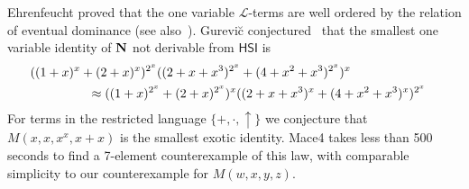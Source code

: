 \documentclass[eqnor,reqno]{amsart}
\theoremstyle{plain}
\theoremstyle{definition}
\newcommand{\HSI}{\textsf{HSI}}
\begin{document}
Ehrenfeucht \cite{ehr} proved that the one variable $\mathscr{L}$-terms
are well ordered by the relation of eventual dominance (see also~\cite[Theorem~A.5]{alsjac2}).  Gurevi\u{c}
conjectured~\cite[Remark~2 on page~29]{gur90} that the smallest one variable identity of ${\bf
N}$ not derivable from
$\HSI$ is 
%
\begin{eqnarray*}
\lefteqn{((1+x)^x+(2+x)^x)^{2^x}((2+x+x^3)^{2^x}+
(4+x^2+x^3)^{2^x})^x}&&\\
&\phantom{abcdefdgh}\approx 
((1+x)^{2^x}+(2+x)^{2^x})^x((2+x+x^3)^x+(4+x^2+x^3)^x)^{2^x}&
\end{eqnarray*} 
%
For terms in the restricted language $\{+,\cdot,\uparrow\}$ we conjecture
that $M(x,x,x^x,x+x)$ is the smallest exotic identity.  Mace4 takes less than 500 seconds to find a 7-element counterexample of this law, with comparable simplicity to our counterexample for $M(w,x,y,z)$.
\end{document}
